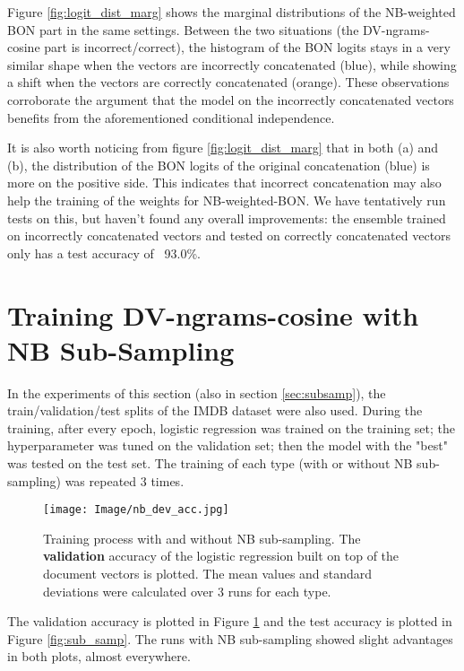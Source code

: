 \documentclass[11pt]{article}
\begin{document}
Figure \ref{fig:logit_dist_marg} shows the marginal distributions of the NB-weighted BON part in the same settings. Between the two situations (the DV-ngrams-cosine part is incorrect/correct), the histogram of the BON logits stays in a very similar shape when the vectors are incorrectly concatenated (blue), while showing a shift when the vectors are correctly concatenated (orange). These observations corroborate the argument that the model on the incorrectly concatenated vectors benefits from the aforementioned conditional independence.

It is also worth noticing from figure \ref{fig:logit_dist_marg} that in both (a) and (b), the distribution of the BON logits of the original concatenation (blue) is more on the positive side. This indicates that incorrect concatenation may also help the training of the weights for NB-weighted-BON. We have tentatively run tests on this, but haven't found any overall improvements: the ensemble trained on incorrectly concatenated vectors and tested on correctly concatenated vectors only has a test accuracy of ~93.0\%.

\section{Training DV-ngrams-cosine with NB Sub-Sampling}
\label{sec_appendix_subsamp}
In the experiments of this section (also in section \ref{sec:subsamp}), the train/validation/test splits \citep{suchin2020} of the IMDB dataset were also used. During the training, after every epoch, logistic regression was trained on the training set; the hyperparameter  was tuned on the validation set; then the model with the "best"  was tested on the test set. The training of each type (with or without NB sub-sampling) was repeated 3 times.\newline

\begin{figure}[h] \centering \texttt{[image: Image/nb\_dev\_acc.jpg]}
    \caption{Training process with and without NB sub-sampling. The \textbf{validation} accuracy of the logistic regression built on top of the document vectors is plotted. The mean values and standard deviations were calculated over 3 runs for each type.}
    \label{fig:sub_samp_dev}
\end{figure}

The validation accuracy is plotted in Figure \ref{fig:sub_samp_dev} and the test accuracy is plotted in Figure \ref{fig:sub_samp}. The runs with NB sub-sampling showed slight advantages in both plots, almost everywhere.
\end{document}

